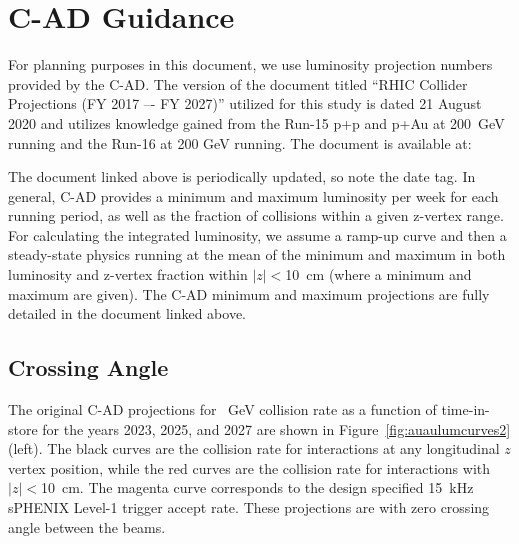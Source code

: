 \chapter{C-AD Guidance}
\label{chap:cad}

For planning purposes in this document, we use luminosity projection numbers provided by the C-AD.   The version of the document titled 
``RHIC Collider Projections (FY 2017 –- FY 2027)'' utilized for this study is dated 21 August 2020 and utilizes knowledge gained from the Run-15 p+p and p+Au at 200~GeV running and the Run-16 \auau at 200 GeV running.   The document is available at:

\bigskip
{\color{blue}{http://www.rhichome.bnl.gov/RHIC/Runs/RhicProjections.pdf}} 
\bigskip

The document linked above is periodically updated, so note the date tag.  In general, C-AD provides a minimum and maximum luminosity per week for each running period, as well as the fraction of collisions within a given z-vertex range. For calculating the integrated luminosity, we assume a ramp-up curve and then a steady-state physics running at the mean of the minimum and maximum in both luminosity and z-vertex fraction within $|z|<$10~cm (where a minimum and maximum are given).  The C-AD minimum and maximum projections are fully detailed in the document linked above.

\section{Crossing Angle}

The original C-AD projections for ~GeV collision rate as a function of time-in-store for the years 2023, 2025, and 2027 are shown in Figure~\ref{fig:auaulumcurves2} (left).    The black curves are the collision rate for interactions at any longitudinal $z$ vertex position, while the red curves are the collision rate for interactions with $|z|<$10~cm.    The magenta curve corresponds to the design specified 15~kHz sPHENIX Level-1 trigger accept rate.
These projections are with zero crossing angle between the beams.   

